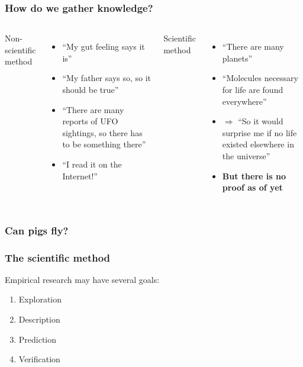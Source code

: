 \documentclass{beamer}
\begin{document}
\begin{frame}
  \frametitle{How do we gather knowledge?}

  \begin{columns}[c]

  Non-scientific method
    \begin{itemize}
    \item ``My gut feeling says it is''
    \item ``My father says so, so it should be true''
    \item ``There are many reports of UFO sightings, so there has to be something there''
    \item ``I read it on the Internet!''
    \end{itemize}

  \pause

  Scientific method
    \begin{itemize}
    \item ``There are many planets''
    \item ``Molecules necessary for life are found everywhere''
    \item $\Rightarrow$ ``So it would surprise me if no life existed elsewhere in the universe''
    \item \textbf{But there is no proof as of yet}
    \end{itemize}

  \end{columns}
\end{frame}

\begin{frame}
  \frametitle{Can pigs fly?}
\end{frame}

\begin{frame}
  \frametitle{The scientific method}

  Empirical research may have several goals:

  \begin{enumerate}
    \item Exploration
    \item Description
    \item Prediction
    \item Verification
  \end{enumerate}
\end{frame}
\end{document}
